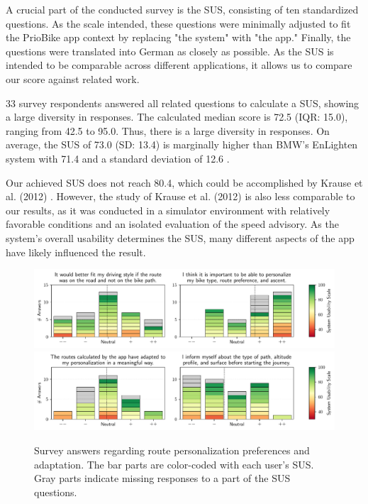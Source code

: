 A crucial part of the conducted survey is the SUS, consisting of ten standardized questions. As the scale intended, these questions were minimally adjusted to fit the PrioBike app context by replacing "the system" with "the app." Finally, the questions were translated into German as closely as possible. As the SUS is intended to be comparable across different applications, it allows us to compare our score against related work. 

33 survey respondents answered all related questions to calculate a SUS, showing a large diversity in responses. The calculated median score is 72.5 (IQR: 15.0), ranging from 42.5 to 95.0. Thus, there is a large diversity in responses. On average, the SUS of 73.0 (SD: 13.4) is marginally higher than BMW's EnLighten system with 71.4 and a standard deviation of 12.6 \cite{wilson_driver_2017}. 

Our achieved SUS does not reach 80.4, which could be accomplished by Krause et al. (2012) \cite{krause_traffic_2012}. However, the study of Krause et al. (2012) \cite{krause_traffic_2012} is also less comparable to our results, as it was conducted in a simulator environment with relatively favorable conditions and an isolated evaluation of the speed advisory. As the system's overall usability determines the SUS, many different aspects of the app have likely influenced the result.

\begin{figure}[t]
\caption{Survey answers regarding route personalization preferences and adaptation. The bar parts are color-coded with each user's SUS. Gray parts indicate missing responses to a part of the SUS questions.}\label{fig:route-personalization}
\includegraphics[width=\linewidth]{images/app-usability-questions-route-personalization.pdf}
\\
\includegraphics[width=\linewidth]{images/app-usability-questions-route-personalization-adaptation.pdf}
\end{figure}

